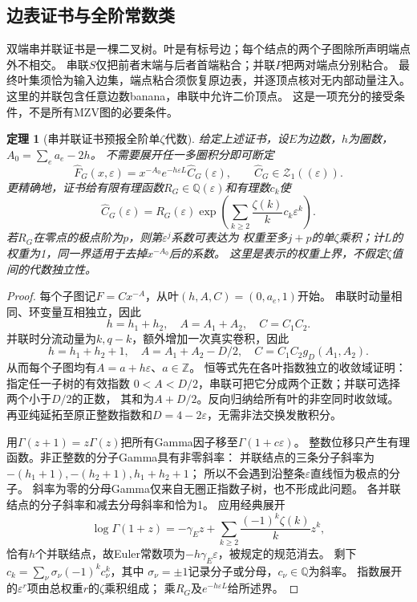 \documentclass[11pt,a4paper]{ctexart}
\theoremstyle{cnplain}\newtheorem{theorem}{定理}[section]
\theoremstyle{definition}\newtheorem{definition}[theorem]{定义}
\theoremstyle{remark}\newtheorem{remark}[theorem]{注}
\begin{document}
\subsection{边表证书与全阶常数类}
双端串并联证书是一棵二叉树。叶是有标号边；每个结点的两个子图除所声明端点外不相交。
串联$S$仅把前者末端与后者首端粘合；并联$P$把两对端点分别粘合。
最终叶集须恰为输入边集，端点粘合须恢复原边表，并逐顶点核对无内部动量注入。
这里的并联包含任意边数banana，串联中允许二价顶点。
这是一项充分的接受条件，不是所有MZV图的必要条件。

\begin{theorem}[串并联证书预报全阶单$\zeta$代数]\label{thm:masslesssp}
给定上述证书，设$E$为边数，$h$为圈数，$A_0=\sum_e a_e-2h$。
不需要展开任一多圈积分即可断定
\[
 \widehat F_G(x,\varepsilon)
 =x^{-A_0}e^{-h\varepsilon L}\widehat C_G(\varepsilon),
 \qquad \widehat C_G\in\mathcal Z_1((\varepsilon)).
 \label{eq:masslessspclass}
\]
更精确地，证书给有限有理函数$R_G\in\mathbb Q(\varepsilon)$和有理数$c_k$使
\[
 \widehat C_G(\varepsilon)=R_G(\varepsilon)
 \exp\left(\sum_{k\ge2}\frac{\zeta(k)}k c_k\varepsilon^k\right).
 \label{eq:masslessgammaexp}
\]
若$R_G$在零点的极点阶为$p$，则第$\varepsilon^j$系数可表达为
权重至多$j+p$的单$\zeta$乘积；计$L$的权重为1，同一界适用于去掉$x^{-A_0}$后的系数。
这里是表示的权重上界，不假定$\zeta$值间的代数独立性。
\end{theorem}
\begin{proof}
每个子图记$F=Cx^{-A}$，从叶$(h,A,C)=(0,a_e,1)$开始。
串联时动量相同、环变量互相独立，因此
\[
 h=h_1+h_2,\quad A=A_1+A_2,\quad C=C_1C_2.
\]
并联时分流动量为$k,q-k$，额外增加一次真实卷积，因此
\[
 h=h_1+h_2+1,\quad A=A_1+A_2-D/2,\quad
 C=C_1C_2g_D(A_1,A_2).
\]
从而每个子图均有$A=a+h\varepsilon$、$a\in\mathbb Z$。
恒等式先在各叶指数独立的收敛域证明：指定任一子树的有效指数
$0<A<D/2$，串联可把它分成两个正数；并联可选择两个小于$D/2$的正数，
其和为$A+D/2$。反向归纳给所有叶的非空同时收敛域。
再亚纯延拓至原正整数指数和$D=4-2\varepsilon$，无需非法交换发散积分。

用$\Gamma(z+1)=z\Gamma(z)$把所有Gamma因子移至$\Gamma(1+c\varepsilon)$。
整数位移只产生有理函数。非正整数的分子Gamma具有非零斜率：
并联结点的三条分子斜率为$-(h_1+1),-(h_2+1),h_1+h_2+1$；
所以不会遇到沿整条$\varepsilon$直线恒为极点的分子。
斜率为零的分母Gamma仅来自无圈正指数子树，也不形成此问题。
各并联结点的分子斜率和减去分母斜率和恰为1。
应用经典展开\cite[5.7.3]{DLMFGamma}
\[
 \log\Gamma(1+z)=-\gamma_E z+
 \sum_{k\ge2}\frac{(-1)^k\zeta(k)}k z^k,
\]
恰有$h$个并联结点，故Euler常数项为$-h\gamma_E\varepsilon$，被规定的规范消去。
剩下$c_k=\sum_\nu\sigma_\nu(-1)^kc_\nu^k$，其中
$\sigma_\nu=\pm1$记录分子或分母，$c_\nu\in\mathbb Q$为斜率。
指数展开的$\varepsilon^r$项由总权重$r$的$\zeta$乘积组成；
乘$R_G$及$e^{-h\varepsilon L}$给所述界。
\end{proof}
\end{document}
